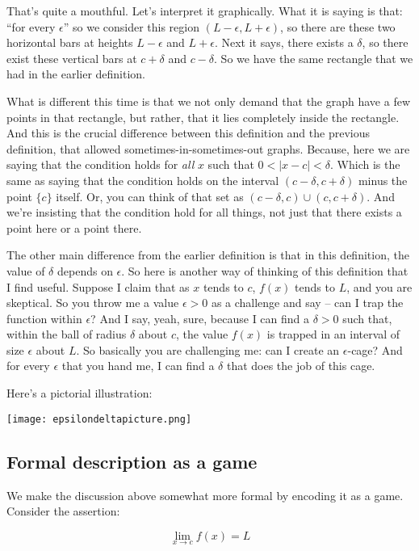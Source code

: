 \documentclass[10pt]{amsart}
\begin{document}
That's quite a mouthful. Let's interpret it graphically. What it
is saying is that: ``for every $\epsilon$'' so we consider this region
$(L - \epsilon, L + \epsilon)$, so there are these two horizontal bars
at heights $L - \epsilon$ and $L + \epsilon$. Next it says, there
exists a $\delta$, so there exist these vertical bars at $c + \delta$
and $c - \delta$. So we have the same rectangle that we had in the
earlier definition.

What is different this time is that we not only demand that the graph
have a few points in that rectangle, but rather, that it lies
completely inside the rectangle. And this is the crucial difference
between this definition and the previous definition, that allowed
sometimes-in-sometimes-out graphs. Because, here we are saying that
the condition holds for {\em all} $x$ such that $0 < |x - c| <
\delta$. Which is the same as saying that the condition holds on the
interval $(c - \delta, c + \delta)$ minus the point $\{ c \}$
itself. Or, you can think of that set as $(c - \delta, c) \cup (c, c +
\delta)$. And we're insisting that the condition hold for all things,
not just that there exists a point here or a point there.

The other main difference from the earlier definition is that in this
definition, the value of $\delta$ depends on $\epsilon$. So here is
another way of thinking of this definition that I find useful. Suppose
I claim that as $x$ tends to $c$, $f(x)$ tends to $L$, and you are
skeptical. So you throw me a value $\epsilon > 0$ as a challenge and
say -- can I trap the function within $\epsilon$? And I say, yeah,
sure, because I can find a $\delta > 0$ such that, within the ball of
radius $\delta$ about $c$, the value $f(x)$ is trapped in an interval
of size $\epsilon$ about $L$. So basically you are challenging me: can
I create an $\epsilon$-cage? And for every $\epsilon$ that you hand
me, I can find a $\delta$ that does the job of this cage.

Here's a pictorial illustration:

\texttt{[image: epsilondeltapicture.png]}

\subsection{Formal description as a game}

We make the discussion above somewhat more formal by encoding it as a
game. Consider the assertion:

$$\lim_{x \to c} f(x) = L$$
\end{document}
